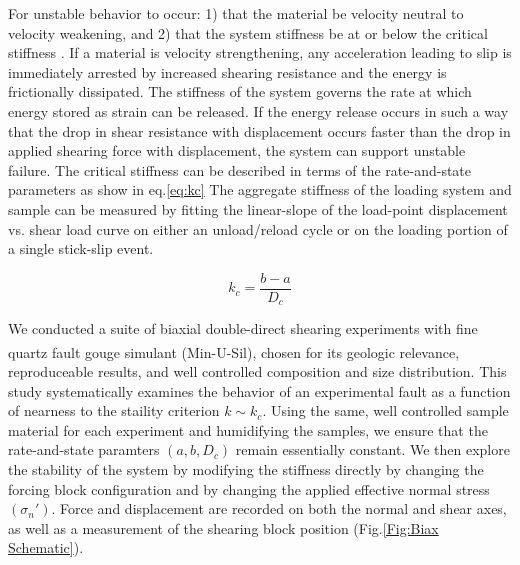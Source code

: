 \documentclass[11pt]{article}
\begin{document}
For unstable behavior to occur: 1) that the material be
velocity neutral to velocity weakening, and 2) that the system stiffness be at
or below the critical stiffness \cite{Marone:1998, Scholz:2002}. If a
material is velocity strengthening, any acceleration leading to slip is
immediately arrested by increased shearing resistance and the energy is
frictionally dissipated. The stiffness of the system governs the rate at which
energy stored as strain can be released. If the energy release occurs in such a
way that the drop in shear resistance with displacement occurs faster than the
drop in applied shearing force with displacement, the system can support
unstable failure. The critical stiffness can be described in terms of the
rate-and-state parameters as show in eq.\ref{eq:kc} The aggregate stiffness of
the loading system and sample can be measured by fitting the linear-slope
of the load-point displacement vs. shear load curve on either an unload/reload
cycle or on the loading portion of a single stick-slip event.

\begin{equation}
    k_c = \frac{b-a}{D_c}
    \label{equation:kc}
\end{equation}

We conducted a suite of biaxial double-direct shearing experiments with fine
quartz fault gouge simulant (Min-U-Sil\textsuperscript{\textregistered}), chosen
for its geologic relevance, reproduceable results, and well controlled
composition and size distribution. This study systematically examines the
behavior of an experimental fault as a function of nearness to the staility
criterion $k \sim k_c$. Using the same, well  controlled sample material for
each experiment and humidifying the samples, we ensure that the rate-and-state
paramters $(a,b,D_c)$ remain essentially constant. We then explore the stability
of the system by modifying the stiffness directly by changing the forcing block
configuration and by changing the applied effective normal stress $(\sigma_n')$.
Force and displacement are recorded on both the normal and shear axes, as well
as a measurement of the shearing block position (Fig.\ref{Fig:Biax Schematic}).
\end{document}
